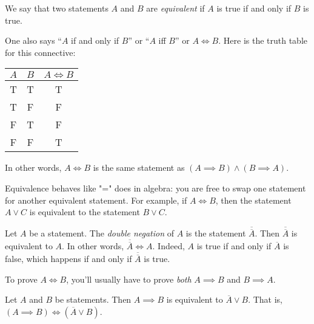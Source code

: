 \documentclass[11pt,dvipsnames]{book}
\numberwithin{figure}{section} %
\numberwithin{table}{section} %
\begin{document}
\begin{definition}
    We say that two statements $A$ and $B$ are \emph{equivalent} if $A$ is true if and only if $B$ is true.
\end{definition}

One also says ``$A$ if and only if $B$'' or ``$A$ iff $B$'' or $A \iff B$.
Here is the truth table for this connective:
\begin{center}
    \begin{tabular}{ c|c|c}
        $A$ & $B$ & $A \iff B$  \\ \hline 
        T & T & T \\
        T & F & F \\
        F & T & F \\
        F & F & T \\
    \end{tabular}
\end{center}

In other words, $A \iff B$ is the same statement as $(A\implies B) \wedge (B \implies A)$.

Equivalence behaves like "=" does in algebra: you are free to swap one statement for another equivalent statement.
For example, if $A\iff B$, then the statement $A \vee C$ is equivalent to the statement $B \vee C$. 

\begin{example}
Let $A$ be a statement.
The \emph{double negation} of $A$ is the statement $\overline{\overline{A}}$.
Then $\overline{\overline{A}}$ is equivalent to $A$.
In other words, $\overline{\overline{A}} \iff A$.
Indeed, $A$ is true if and only if $\overline{A}$ is false, which happens if and only if $\overline{\overline{A}}$ is true.
\end{example}

To prove $A\iff B$, you'll usually have to prove \emph{both} $A\implies B$ and $B\implies A$.

\begin{theorem}
Let $A$ and $B$ be statements.
Then $A \implies B$ is equivalent to $\overline{A} \vee B$.
That is, $(A \implies B) \iff (\overline{A} \vee B)$.
\end{theorem}
\end{document}
